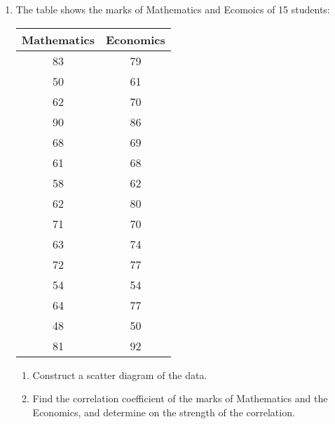 \documentclass{report}
\begin{document}
\begin{multicols}{2}
\begin{enumerate}
    \item The table shows the marks of Mathematics and Ecomoics of 15 students:
          \begin{center}
            \begin{tabular}{|c|c|}
              \hline
              Mathematics & Economics \\
              \hline
              83          & 79        \\
              50          & 61        \\
              62          & 70        \\
              90          & 86        \\
              68          & 69        \\
              61          & 68        \\
              58          & 62        \\
              62          & 80        \\
              71          & 70        \\
              63          & 74        \\
              72          & 77        \\
              54          & 54        \\
              64          & 77        \\
              48          & 50        \\
              81          & 92        \\
              \hline
            \end{tabular}
          \end{center}
          \begin{enumerate}
            \item Construct a scatter diagram of the data.
            \item Find the correlation coefficient of the marks of Mathematics and the Economics,
                  and determine on the strength of the correlation.
          \end{enumerate}


\end{enumerate}
\end{multicols}
\end{document}
